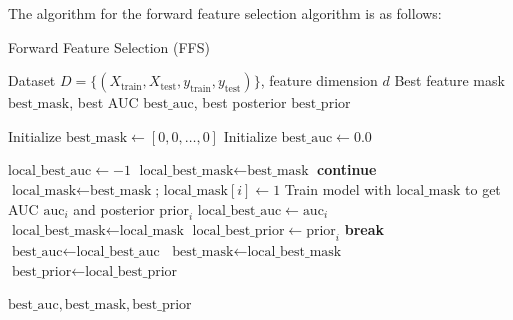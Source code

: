 \documentclass[12pt,a4paper]{article}
\begin{document}
The algorithm for the forward feature selection algorithm is as follows:
\begin{algorithm}[H]
\caption{Forward Feature Selection (FFS)}
\label{alg:ffs}
\begin{algorithmic}[1]
\Require Dataset $D = \{(X_{\text{train}}, X_{\text{test}}, y_{\text{train}}, y_{\text{test}})\}$, feature dimension $d$
\Ensure Best feature mask $\text{best\_mask}$, best AUC $\text{best\_auc}$, best posterior $\text{best\_prior}$

\State Initialize $\text{best\_mask} \gets [0, 0, \dots, 0]$ 
\State Initialize $\text{best\_auc} \gets 0.0$

\Repeat
    \State $\text{local\_best\_auc} \gets -1$
    \State $\text{local\_best\_mask} \gets \text{best\_mask}$
            \State \textbf{continue}
        \EndIf
        \State $\text{local\_mask} \gets \text{best\_mask}$; $\text{local\_mask}[i] \gets 1$
        \State Train model with $\text{local\_mask}$ to get AUC $\text{auc}_i$ and posterior $\text{prior}_i$
            \State $\text{local\_best\_auc} \gets \text{auc}_i$
            \State $\text{local\_best\_mask} \gets \text{local\_mask}$
            \State $\text{local\_best\_prior} \gets \text{prior}_i$
        \EndIf
    \EndFor
        \State \textbf{break}
    \Else
        \State $\text{best\_auc} \gets \text{local\_best\_auc}$
        \State $\text{best\_mask} \gets \text{local\_best\_mask}$
        \State $\text{best\_prior} \gets \text{local\_best\_prior}$
    \EndIf
{}

\State \Return $\text{best\_auc}, \text{best\_mask}, \text{best\_prior}$
\end{algorithmic}
\end{algorithm}
\end{document}
